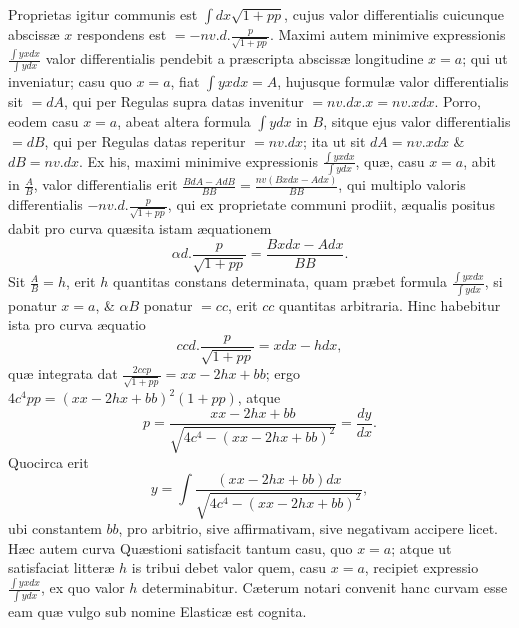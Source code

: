 Proprietas igitur communis est $\int dx\sqrt{1+pp}$, cujus valor differentialis cuicunque abscissæ $x$ respondens est $=-nv.d.\frac p{\sqrt{1+pp}}$. Maximi autem minimive expressionis $\frac{\int yxdx}{\int ydx}$ valor differentialis pendebit a præscripta abscissæ longitudine $x=a$; qui ut inveniatur; casu quo $x=a$, fiat $\int yxdx=A$, hujusque formulæ valor differentialis sit $=dA$, qui per Regulas supra datas invenitur $=nv.dx.x=nv.xdx$. Porro, eodem casu $x=a$, abeat altera formula $\int ydx$ in $B$, sitque ejus valor differentialis $=dB$, qui per Regulas datas reperitur $=nv.dx$; ita ut sit $dA=nv.xdx$ \& $dB=nv.dx$. Ex his, maximi minimive expressionis $\frac{\int yxdx}{\int ydx}$, quæ, casu $x=a$, abit in $\frac AB$, valor differentialis erit $\frac{BdA-AdB}{BB}=\frac{nv(Bxdx-Adx)}{BB}$, qui multiplo valoris differentialis $-nv.d.\frac p{\sqrt{1+pp}}$, qui ex proprietate communi prodiit, æqualis positus dabit pro curva quæsita istam æquationem
\[\alpha d.\frac p{\sqrt{1+pp}}=\frac{Bxdx-Adx}{BB}.\]
Sit $\frac AB=h$, erit $h$ quantitas constans determinata, quam præbet formula $\frac{\int yxdx}{\int ydx}$, si ponatur $x=a$, \& $\alpha B$ ponatur $=cc$, erit $cc$ quantitas arbitraria. Hinc habebitur ista pro curva æquatio
\[ccd.\frac p{\sqrt{1+pp}}=xdx-hdx,\]
quæ integrata dat $\frac{2ccp}{\sqrt{1+pp}}=xx-2hx+bb$; ergo $4c^4pp=(xx-2hx+bb)^2(1+pp)$, atque
\[p=\frac{xx-2hx+bb}{\sqrt{4c^4-(xx-2hx+bb)^2}}=\frac{dy}{dx}.\]
Quocirca erit
\[y=\int\frac{(xx-2hx+bb)dx}{\sqrt{4c^4-(xx-2hx+bb)^2}},\]
ubi constantem $bb$, pro arbitrio, sive affirmativam, sive negativam accipere licet. Hæc autem curva Quæstioni satisfacit tantum casu, quo $x=a$; atque ut satisfaciat litteræ $h$ is tribui debet valor quem, casu $x=a$, recipiet expressio $\frac{\int yxdx}{\int ydx}$, ex quo valor $h$ determinabitur. Cæterum notari convenit hanc curvam esse eam quæ vulgo sub nomine Elasticæ est cognita.
